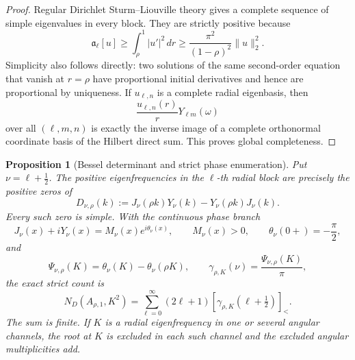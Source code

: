 \documentclass[11pt]{article}
\numberwithin{equation}{section}
\newtheorem{proposition}[theorem]{Proposition}
\theoremstyle{definition}
\theoremstyle{remark}
\begin{document}
\begin{proof}
Regular Dirichlet Sturm--Liouville theory gives a complete sequence of
simple eigenvalues in every block.  They are strictly positive because
\[
  \mathfrak a_\ell[u]\ge\int_\rho^1|u'|^2\,dr
  \ge\frac{\pi^2}{(1-\rho)^2}\|u\|_2^2.
\]
Simplicity also follows directly: two solutions of the same second-order
equation that vanish at \(r=\rho\) have proportional initial derivatives
and hence are proportional by uniqueness.  If \(u_{\ell,n}\) is a complete
radial eigenbasis, then
\[
  \frac{u_{\ell,n}(r)}rY_{\ell m}(\omega)
\]
over all \((\ell,m,n)\) is exactly the inverse image of a complete
orthonormal coordinate basis of the Hilbert direct sum.  This proves global
completeness.
\end{proof}

\begin{proposition}[Bessel determinant and strict phase enumeration]
\label{prop:sc-bessel-phase-count}
Put \(\nu=\ell+\tfrac12\).  The positive eigenfrequencies in the
\(\ell\)-th radial block are precisely the positive zeros of
\begin{equation}
  D_{\nu,\rho}(k)
  :=J_\nu(\rho k)Y_\nu(k)-Y_\nu(\rho k)J_\nu(k).
  \label{eq:sc-bessel-determinant}
\end{equation}
Every such zero is simple.  With the continuous phase branch
\begin{equation}
  J_\nu(x)+iY_\nu(x)=M_\nu(x)e^{i\theta_\nu(x)},
  \qquad M_\nu(x)>0,
  \qquad \theta_\nu(0+)=-\frac\pi2,
  \label{eq:sc-phase-branch}
\end{equation}
and
\[
  \Psi_{\nu,\rho}(K)=\theta_\nu(K)-\theta_\nu(\rho K),
  \qquad
  \gamma_{\rho,K}(\nu)=\frac{\Psi_{\nu,\rho}(K)}\pi,
\]
the exact strict count is
\begin{equation}
  N_D(A_{\rho,1},K^2)
  =\sum_{\ell=0}^{\infty}(2\ell+1)
  [\gamma_{\rho,K}(\ell+\tfrac12)]_<.
  \label{eq:sc-exact-phase-count}
\end{equation}
The sum is finite.  If \(K\) is a radial eigenfrequency in one or several
angular channels, the root at \(K\) is excluded in each such channel and the
excluded angular multiplicities add.
\end{proposition}
\end{document}

